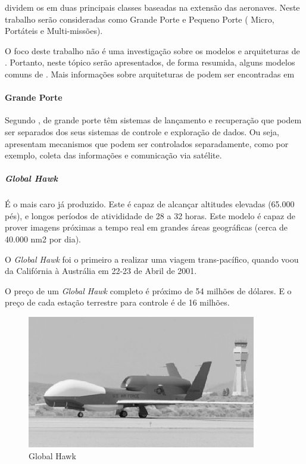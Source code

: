 \cite{Drew2005} dividem os \vants em duas principais classes baseadas na extensão das aeronaves. Neste trabalho serão consideradas como Grande Porte e Pequeno Porte ( Micro, Portáteis e Multi-missões).

O foco deste trabalho não é uma investigação sobre os modelos e arquiteturas de \vants. Portanto,  neste tópico serão apresentados, de forma resumida, alguns modelos comuns de \vants. Mais informações sobre arquiteturas de \vants podem ser encontradas em \cite{Drew2005} \cite{uav_roadmap2005} \cite{ Bone2003} \cite{Holder2001}


\paragraph{Grande Porte}
Segundo \cite{Drew2005}, \vants de grande porte têm sistemas de lançamento e recuperação que podem ser separados dos seus sistemas de controle e exploração de dados. Ou seja, apresentam mecanismos que podem ser controlados separadamente, como por exemplo, coleta das informações e comunicação via satélite.



 \subparagraph{\emph{Global Hawk} }

 É o \vant mais caro já produzido. Este \vant é capaz de alcançar altitudes elevadas (65.000 pés), e longos períodos de ativididade de 28 a 32 horas. Este modelo é capaz de prover imagens próximas a tempo real em grandes áreas geográficas (cerca de 40.000 nm2 por dia). \cite{uav_roadmap2005}

O \emph{Global Hawk} foi o primeiro \vant a realizar uma viagem trans-pacífico, quando voou da Califórnia à Austrália em 22-23 de Abril de 2001. \cite{Drew2005}

O preço de um \emph{Global Hawk} completo é próximo de 54 milhões de dólares. E o preço de cada estação terrestre para controle
é de 16 milhões.

\begin{figure}[h!]
\centering
\includegraphics[width=10cm]{pictures/global_hawk.png}
\caption{Global Hawk}
 \label{fig:global_hawk}
\end{figure}


